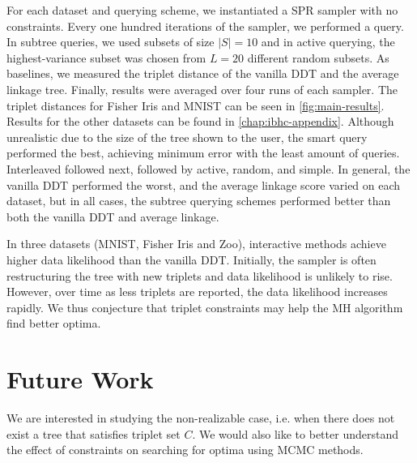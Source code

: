 For each dataset and querying scheme, we instantiated a SPR
sampler with no constraints. Every one hundred iterations of the 
sampler, we performed a query.
In subtree queries, we used subsets of size $|S| = 10$ 
and in active querying, the highest-variance subset was chosen from $L = 20$ different random subsets.
As baselines,
we measured the triplet distance of the vanilla DDT
and the average linkage tree.
Finally, results were averaged over four runs of each sampler.
The triplet distances for Fisher Iris and MNIST can be seen in \autoref{fig:main-results}. Results for the other datasets
can be found in \autoref{chap:ibhc-appendix}.
Although unrealistic due to the size of the tree shown to the user, 
the smart query performed the best, achieving minimum error
with the least amount of queries. Interleaved followed next,
followed by active, random, and simple. In general, the vanilla
DDT performed the worst, and the average linkage
score varied on each dataset, but in all cases, the
subtree querying schemes performed better than both the vanilla DDT
and average linkage.

In three datasets (MNIST, Fisher Iris and Zoo), 
interactive methods
achieve higher data likelihood than the vanilla DDT.
Initially, the sampler is often restructuring the tree
with new triplets
and data likelihood is unlikely to rise. However, over time
as less triplets are reported,
the data likelihood increases rapidly.
We thus conjecture that triplet constraints 
may help the MH algorithm find better optima.

\section{Future Work}
We are interested in studying the non-realizable case, i.e.
when there does not exist a tree that satisfies triplet set $C$. We would also like to better understand the effect of constraints on searching
for optima using MCMC methods.

\ibhcack

